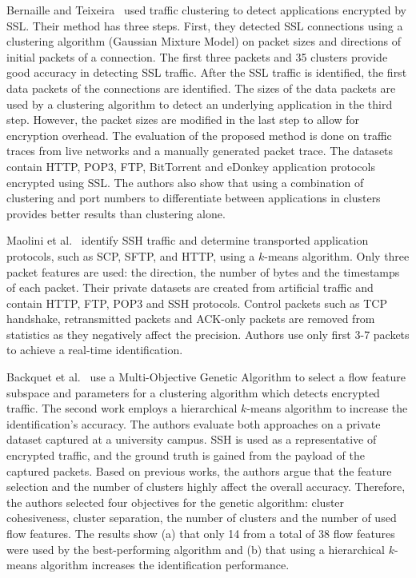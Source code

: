 Bernaille and Teixeira~\cite{Bernaille-2007-Early} used traffic clustering to detect applications encrypted by SSL. Their method has three steps. First, they detected SSL connections using a clustering algorithm (Gaussian Mixture Model) on packet sizes and directions of initial packets of a connection. The first three packets and 35 clusters provide good accuracy in detecting SSL traffic. After the SSL traffic is identified, the first data packets of the connections are identified. The sizes of the data packets are used by a clustering algorithm to detect an underlying application in the third step. However, the packet sizes are modified in the last step to allow for encryption overhead. The evaluation of the proposed method is done on traffic traces from live networks and a manually generated packet trace. The datasets contain HTTP, POP3, FTP, BitTorrent and eDonkey application protocols encrypted using SSL. The authors also show that using a combination of clustering and port numbers to differentiate between applications in clusters provides better results than clustering alone.

Maolini et al.~\cite{Maiolini-2009-Real} identify SSH traffic and determine transported application protocols, such as SCP, SFTP, and HTTP, using a $k$-means algorithm. Only three packet features are used: the direction, the number of bytes and the timestamps of each packet. Their private datasets are created from artificial traffic and contain HTTP, FTP, POP3 and SSH protocols. Control packets such as TCP handshake, retransmitted packets and ACK-only packets are removed from statistics as they negatively affect the precision. Authors use only first 3-7 packets to achieve a real-time identification.

Backquet et al.~\cite{Bacquet-2009-Investigation, Bacquet-2011-Genetic} use a Multi-Objective Genetic Algorithm to select a flow feature subspace and parameters for a clustering algorithm which detects encrypted traffic. The second work employs a hierarchical $k$-means algorithm to increase the identification's accuracy. The authors evaluate both approaches on a private dataset captured at a university campus. SSH is used as a representative of encrypted traffic, and the ground truth is gained from the payload of the captured packets. Based on previous works, the authors argue that the feature selection and the number of clusters highly affect the overall accuracy. Therefore, the authors selected four objectives for the genetic algorithm: cluster cohesiveness, cluster separation, the number of clusters and the number of used flow features. The results show (a) that only 14 from a total of 38 flow features were used by the best-performing algorithm and (b) that using a hierarchical $k$-means algorithm increases the identification performance.


